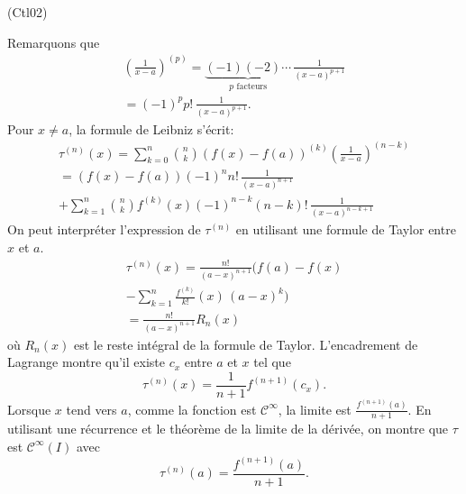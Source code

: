 \begin{tiny}(Ctl02)\end{tiny} Remarquons que
\begin{multline*}
  \left(\frac{1}{x-a}\right)^{(p)}
  = \underset{p \text{ facteurs}}{\underbrace{(-1)(-2)\cdots}}\,\frac{1}{(x-a)^{p+1}}\\
  = (-1)^p p!\,\frac{1}{(x-a)^{p+1}}.
\end{multline*}
Pour $x\neq a$, la formule de Leibniz s'écrit:
\begin{multline*}
  \tau^{(n)}(x)
= \sum_{k=0}^n \binom{n}{k}\left(f(x) - f(a)\right)^{(k)} \left(\frac{1}{x-a}\right)^{(n-k)}\\
= \left(f(x) - f(a)\right)(-1)^n n! \,\frac{1}{(x-a)^{n+1}}\\
+ \sum_{k=1}^n \binom{n}{k}f^{(k)}(x)(-1)^{n-k}(n-k)!\, \frac{1}{(x-a)^{n-k+1}}
\end{multline*}
On peut interpréter l'expression de $\tau^{(n)}$ en utilisant une formule de Taylor entre $x$ et $a$. 
\begin{multline*}
  \tau^{(n)}(x)
  = \frac{n!}{(a-x)^{n+1}}(f(a)-f(x) \\
  - \sum_{k=1}^n \frac{f^{(k)}}{k!}(x)\,(a-x)^{k})\\
  = \frac{n!}{(a-x)^{n+1}}R_n(x)
\end{multline*}
où $R_n(x)$ est le reste intégral de la formule de Taylor. L'encadrement de Lagrange montre qu'il existe $c_x$ entre $a$ et $x$ tel que
\[
 \tau^{(n)}(x) = \frac{1}{n+1}f^{(n+1)}(c_x).
\]
Lorsque $x$ tend vers $a$, comme la fonction est $\mathcal C^\infty$, la limite est $\frac{f^{(n+1)}(a)}{n+1}$. En utilisant une récurrence et le théorème de la limite de la dérivée, on  montre que $\tau$ est $\mathcal C^\infty(I)$ avec 
\[
  \tau^{(n)}(a) = \frac{f^{(n+1)}(a)}{n+1}.
\]
